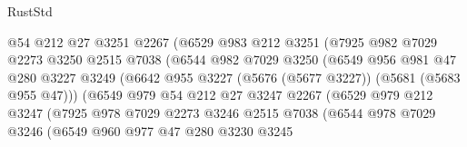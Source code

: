 \begin{lexlean}{RustStd}
\begin{coremodule}
                            @54
                            @212
                            @27
                            @3251
                            @2267
                            (@6529
                              @983
                              @212
                              @3251
                              (@7925
                                @982
                                @7029
                                @2273
                                @3250
                                @2515
                                @7038
                                (@6544
                                  @982
                                  @7029
                                  @3250
                                  (@6549
                                    @956
                                    @981
                                    @47
                                    @280
                                    @3227
                                    @3249
                                    (@6642
                                      @955
                                      @3227
                                      (@5676 (@5677 @3227))
                                      (@5681 (@5683 @955 @47)))
                                    (@6549
                                      @979
                                      @54
                                      @212
                                      @27
                                      @3247
                                      @2267
                                      (@6529
                                        @979
                                        @212
                                        @3247
                                        (@7925
                                          @978
                                          @7029
                                          @2273
                                          @3246
                                          @2515
                                          @7038
                                          (@6544
                                            @978
                                            @7029
                                            @3246
                                            (@6549
                                              @960
                                              @977
                                              @47
                                              @280
                                              @3230
                                              @3245

\end{coremodule}
\end{lexlean}
